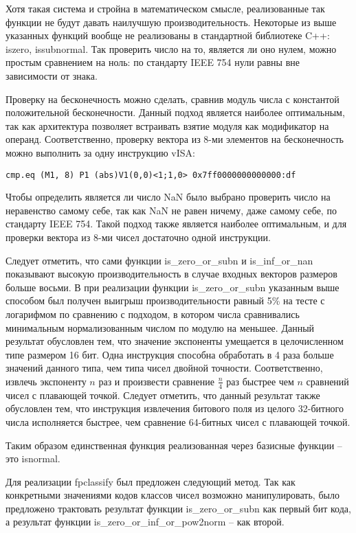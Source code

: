 Хотя такая система и стройна в математическом смысле, реализованные так функции не будут давать наилучшую производительность.
Некоторые из выше указанных функций вообще не реализованы в стандартной библиотеке C++: iszero, issubnormal.
Так проверить число на то, является ли оно нулем, можно простым сравнением на ноль: по стандарту IEEE 754 \cite{ieee754} нули равны вне зависимости от знака.

Проверку на бесконечность можно сделать, сравнив модуль числа с константой положительной бесконечности.
Данный подход является наиболее оптимальным, так как архитектура позволяет встраивать взятие модуля как модификатор на операнд.
Соответственно, проверку вектора из 8-ми элементов на бесконечность можно выполнить за одну инструкцию vISA:

\begin{lstlisting}
cmp.eq (M1, 8) P1 (abs)V1(0,0)<1;1,0> 0x7ff0000000000000:df
\end{lstlisting}

Чтобы определить является ли число NaN было выбрано проверить число на неравенство самому себе, так как NaN не равен ничему, даже самому себе, по стандарту IEEE 754.
Такой подход также является наиболее оптимальным, и для проверки вектора из 8-ми чисел достаточно одной инструкции.

Следует отметить, что сами функции is\_zero\_or\_subn и is\_inf\_or\_nan показывают высокую производительность в случае входных векторов размеров больше восьми.
В при реализации функции is\_zero\_or\_subn указанным выше способом был получен выигрыш производительности равный 5\% на тесте с логарифмом по сравнению с подходом, в котором числа сравнивались минимальным нормализованным числом по модулю на меньшее.
Данный результат обусловлен тем, что значение экспоненты умещается в целочисленном типе размером 16 бит.
Одна инструкция способна обработать в 4 раза больше значений данного типа, чем типа чисел двойной точности.
Соответственно, извлечь экспоненту $n$ раз и произвести сравнение $\frac{n}{4}$ раз быстрее чем $n$ сравнений чисел с плавающей точкой.
Следует отметить, что данный результат также обусловлен тем, что инструкция извлечения битового поля из целого 32-битного числа исполняется быстрее, чем сравнение 64-битных чисел с плавающей точкой.

Таким образом единственная функция реализованная через базисные функции -- это isnormal.

Для реализации fpclassify был предложен следующий метод.
Так как конкретными значениями кодов классов чисел возможно манипулировать, было предложено трактовать результат функции is\_zero\_or\_subn как первый бит кода, а результат функции is\_zero\_or\_inf\_or\_pow2norm -- как второй.

